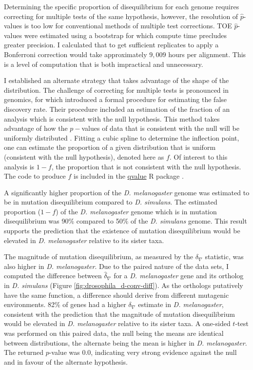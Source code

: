 

Determining the specific proportion of disequilibrium for each genome requires correcting for multiple tests of the same hypothesis, however, the resolution of $\hat p$-values is too low for conventional methods of multiple test corrections. TOE $\hat p$-values were estimated using a bootstrap for which compute time precludes greater precision. I calculated that to get sufficient replicates to apply a Bonferroni correction would take approximately $9,009$ hours per alignment. This is a level of computation that is both impractical and unnecessary. 

I established an alternate strategy that takes advantage of the shape of the distribution. The challenge of correcting for multiple tests is pronounced in genomics, for which \cite{Storey2003StatisticalStudies} introduced a formal procedure for estimating the false discovery rate. Their procedure included an estimation of the fraction of an analysis which is consistent with the null hypothesis. This method takes advantage of how the $p-$values of data that is consistent with the null will be uniformly distributed \citep[see Figure 1][]{Storey2003StatisticalStudies}. Fitting a cubic spline to determine the inflection point, one can estimate the proportion of a given distribution that is uniform (consistent with the null hypothesis), denoted here as $f$. Of interest to this analysis is $1 - f$, the proportion that is not consistent with the null hypothesis. The code to produce $f$ is included in the \href{https://github.com/StoreyLab/qvalue}{qvalue} R package \citep{Storey2004StrongApproach}.

A significantly higher proportion of the \textit{D. melanogaster} genome was estimated to be in mutation disequilibrium compared to \textit{D. simulans}. The estimated proportion ($1 - f$) of the \textit{D. melanogaster} genome which is in mutation disequilibrium was 90\% compared to 50\% of the \textit{D. simulans} genome. This result supports the prediction that the existence of mutation disequilibrium would be elevated in \textit{D. melanogaster} relative to its sister taxa.

The magnitude of mutation disequilibrium, as measured by the $\delta_\nabla$  statistic, was also higher in \textit{D. melanogaster}. Due to the paired nature of the data sets, I computed the difference between $\hat \delta_\nabla$ for a \textit{D. melanogaster} gene and its ortholog in \textit{D. simulans} (Figure \ref{fig:drosophila_d-conv-diff}). As the orthologs putatively have the same function, a difference should derive from different mutagenic environments. 82\% of genes had a higher $\delta_\nabla$ estimate in \textit{D. melanogaster}, consistent with the prediction that the magnitude of mutation disequilibrium would be elevated in \textit{D. melanogaster} relative to its sister taxa. A one-sided $t$-test was performed on this paired data, the null being the means are identical between distributions, the alternate being the mean is higher in \textit{D. melanogaster}. The returned $p$-value was 0.0, indicating very strong evidence against the null and in favour of the alternate hypothesis. 

